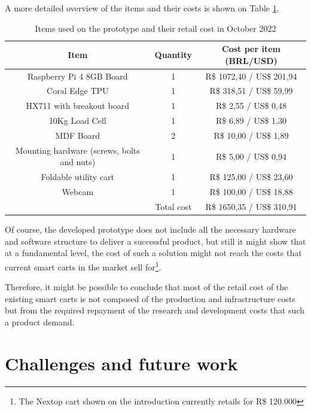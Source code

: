 A more detailed overview of the items and their costs is shown on Table \ref{tbl:cost}.

\begin{table}[H]
	\centering
	\label{tab:correlacao}
    \caption[Items used on the prototype and their approximate retail cost in Brazil as of October 2022]{Items used on the prototype and their retail cost in October 2022}
	\begin{tabular}{c c c}
		\hline 
        Item & Quantity & Cost per item (BRL/USD) \\
		\hline
        Raspberry Pi 4 8GB Board &  1 & R\$ 1072,40 / US\$ 201,94 \\
        Coral Edge TPU &  1 & R\$ 318,51 / US\$ 59,99 \\
        HX711 with breakout board &  1  & R\$ 2,55 / US\$ 0,48 \\
        10Kg Load Cell & 1 & R\$ 6,89 / US\$ 1,30 \\
        MDF Board &  2  & R\$ 10,00 / US\$ 1,89 \\
        Mounting hardware (screws, bolts and nuts) &  1  & R\$ 5,00 / US\$ 0,94 \\
        Foldable utility cart &  1  & R\$ 125,00 / US\$ 23,60 \\
        Webcam &  1  & R\$ 100,00 / US\$ 18,88 \\
		\hline 
        & Total cost & R\$ 1650,35 / US\$ 310,91 \\
        \hline
	\end{tabular}
	\fonte{}
    \label{tbl:cost}
\end{table}

Of course, the developed prototype does not include all the necessary hardware
and software structure to deliver a successful product, but still it might show that at a
fundamental level, the cost of such a solution might not reach the costs that
current smart carts in the market sell for\footnote{The Nextop cart shown on the
introduction currently retails for R\$ 120.000}.

Therefore, it might be possible to conclude that most of the retail cost of the
existing smart carts is not composed of the production and infrastructure costs
but from the required repayment of the research and development costs that such
a product demand.

\section{Challenges and future work}

